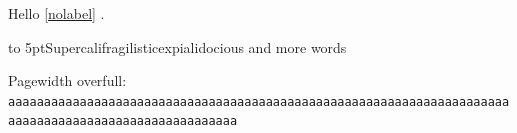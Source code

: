 \documentclass{article}
\begin{document}
Hello \ref{nolabel} \cite{zz}.

\noindent\hbox to 5pt{Supercalifragilisticexpialidocious and more words}

Pagewidth overfull: \texttt{aaaaaaaaaaaaaaaaaaaaaaaaaaaaaaaaaaaaaaaaaaaaaaaaaaaaaaaaaaaaaaaaaaaaaaaaaaaaaaaaaaaaaaaaaaaaaaaaaaaaaa}
\end{document}
